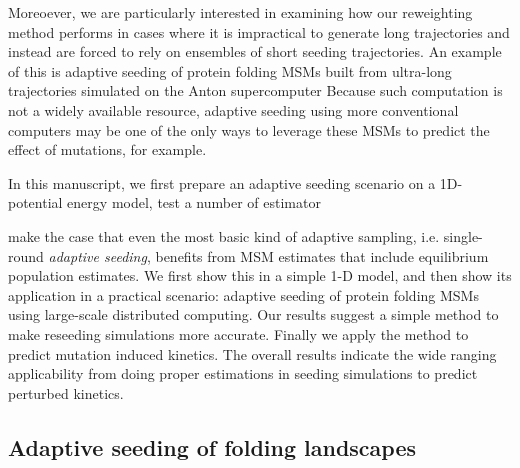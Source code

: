 \documentclass[%
 aip,
rsi,%
 amsmath,amssymb,
 reprint,%
]{revtex4-1}
\begin{document}
Moreoever, we are particularly interested in examining how our reweighting method performs in cases where it is impractical to generate long trajectories and instead are forced to rely on ensembles of short seeding trajectories. An example of this is adaptive seeding of protein folding MSMs built from ultra-long trajectories simulated on the Anton supercomputer\cite{DESRES}  Because such computation is not a widely available resource, adaptive seeding using more conventional computers may be one of the only ways to leverage these MSMs to predict the effect of mutations, for example. 

In this manuscript, we first prepare an adaptive seeding scenario on a 1D-potential energy model, test a number of estimator 

make the case that even the most basic kind of adaptive sampling, i.e. single-round \textit{adaptive seeding}, benefits from MSM estimates that include equilibrium population estimates.  We first show this in a simple 1-D model, and then show its application in a practical scenario: adaptive seeding of protein folding MSMs using large-scale distributed computing. Our results suggest a simple method to make reseeding simulations more accurate. Finally we apply the method to predict mutation induced kinetics. The overall results indicate the wide ranging applicability from doing proper estimations in seeding simulations to predict perturbed kinetics. 

\subsection{\label{sec:level2}Adaptive seeding of folding landscapes}
\end{document}
